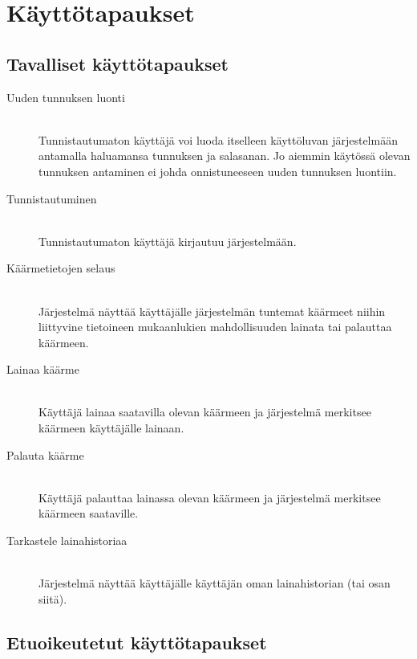 \documentclass[11pt]{article}
\begin{document}
\section{Käyttötapaukset}

\subsection{Tavalliset käyttötapaukset}

\begin{description}
\item[Uuden tunnuksen luonti] \hfill \\
Tunnistautumaton käyttäjä voi luoda itselleen käyttöluvan järjestelmään antamalla haluamansa tunnuksen ja salasanan. Jo aiemmin käytössä olevan tunnuksen antaminen ei johda onnistuneeseen uuden tunnuksen luontiin.
\item[Tunnistautuminen] \hfill \\
Tunnistautumaton käyttäjä kirjautuu järjestelmään.
\item[Käärmetietojen selaus] \hfill \\
Järjestelmä näyttää käyttäjälle järjestelmän tuntemat käärmeet niihin liittyvine tietoineen mukaanlukien mahdollisuuden lainata tai palauttaa käärmeen.
\item[Lainaa käärme] \hfill \\
Käyttäjä lainaa saatavilla olevan käärmeen ja järjestelmä merkitsee käärmeen käyttäjälle lainaan.
\item[Palauta käärme] \hfill \\
Käyttäjä palauttaa lainassa olevan käärmeen ja järjestelmä merkitsee käärmeen saataville.
\item[Tarkastele lainahistoriaa] \hfill \\
Järjestelmä näyttää käyttäjälle käyttäjän oman lainahistorian (tai osan siitä).
\end{description}

\subsection{Etuoikeutetut käyttötapaukset}
\end{document}

